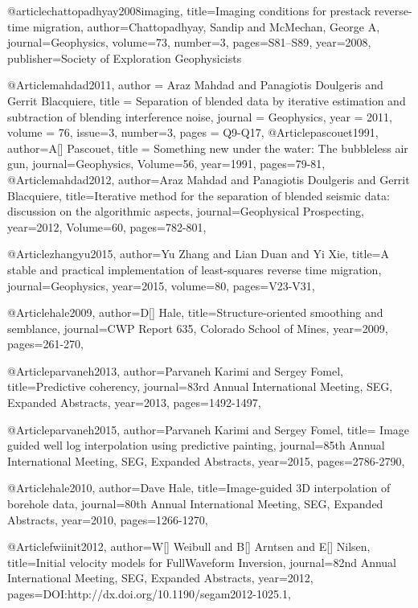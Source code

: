 @article{chattopadhyay2008imaging,
  title={Imaging conditions for prestack reverse-time migration},
  author={Chattopadhyay, Sandip and McMechan, George A},
  journal={Geophysics},
  volume={73},
  number={3},
  pages={S81--S89},
  year={2008},
  publisher={Society of Exploration Geophysicists}
}

@Article{mahdad2011,
  author = 	 {Araz Mahdad and Panagiotis Doulgeris and Gerrit Blacquiere},
  title = 	 {Separation of blended data by iterative estimation and subtraction of blending interference noise},
  journal = 	 {Geophysics},
  year = 	 2011,
  volume =	 76,
  issue=3,
  number=3,
  pages =	 {Q9-Q17},
}
@Article{pascouet1991,
  author={A[] Pascouet},
  title = {Something new under the water: The bubbleless air gun},
  journal={Geophysics},
  Volume=56,
  year=1991,
  pages={79-81},
}
@Article{mahdad2012,
  author={Araz Mahdad and Panagiotis Doulgeris and Gerrit Blacquiere},
  title={Iterative method for the separation of blended seismic data: discussion on the algorithmic aspects},
  journal={Geophysical Prospecting},
  year=2012,
  Volume=60,
  pages={782-801},
}



@Article{zhangyu2015,
  author={Yu Zhang and Lian Duan and Yi Xie},
  title={A stable and practical implementation of least-squares reverse time migration},
  journal={Geophysics},
  year=2015,
  volume=80,
  pages={V23-V31},
}
	




@Article{hale2009,
  author={D[] Hale},
  title={Structure-oriented smoothing and semblance},
  journal={CWP Report 635, Colorado School of Mines},
  year=2009,
  pages={261-270},
}


@Article{parvaneh2013,
  author={Parvaneh Karimi and Sergey Fomel},
  title={Predictive coherency},
  journal={83rd Annual International Meeting, SEG, Expanded Abstracts},
  year=2013,
  pages={1492-1497},
}

@Article{parvaneh2015,
  author={Parvaneh Karimi and Sergey Fomel},
  title={	Image guided well log interpolation using predictive painting},
  journal={85th Annual International Meeting, SEG, Expanded Abstracts},
  year=2015,
  pages={2786-2790},
}

@Article{hale2010,
  author={Dave Hale},
  title={Image-guided 3{D} interpolation of borehole data},
  journal={80th Annual International Meeting, SEG, Expanded Abstracts},
  year=2010,
  pages={1266-1270},
}

@Article{fwiinit2012,
  author={W[] Weibull and B[] Arntsen and E[] Nilsen},
  title={Initial velocity models for FullWaveform Inversion},
  journal={82nd Annual International Meeting, SEG, Expanded Abstracts},
  year=2012,
  pages={DOI:http://dx.doi.org/10.1190/segam2012-1025.1},
}






